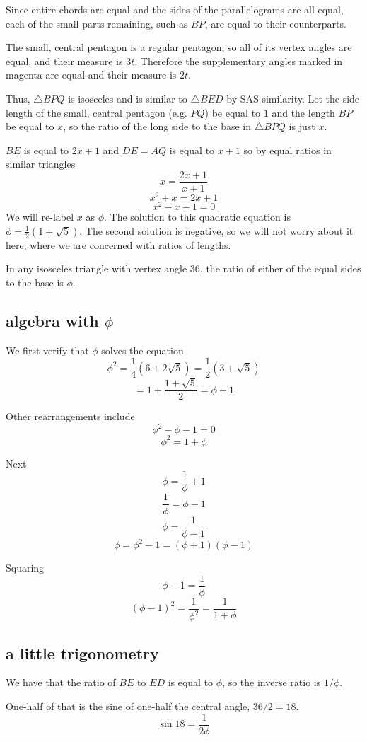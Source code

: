 \documentclass[11pt, oneside]{article}
\begin{document}
Since entire chords are equal and the sides of the parallelograms are all equal, each of the small parts remaining, such as $BP$, are equal to their counterparts.

The small, central pentagon is a regular pentagon, so all of its vertex angles are equal, and their measure is $3t$.  Therefore the supplementary angles marked in magenta are equal and their measure is $2t$.

Thus, $\triangle BPQ$ is isosceles and is similar to $\triangle BED$ by SAS similarity.
Let the side length of the small, central pentagon (e.g. $PQ$) be equal to $1$ and the length $BP$ be equal to $x$, so the ratio of the long side to the base in $\triangle BPQ$ is just $x$.  

$BE$ is equal to $2x + 1$ and $DE = AQ$ is equal to $x + 1$ so by equal ratios in similar triangles
\[ x = \frac{2x + 1}{x + 1} \]
\[ x^2 + x = 2x + 1 \]
\[ x^2 - x - 1 = 0 \]
We will re-label $x$ as $\phi$.  The solution to this quadratic equation is $\phi = \frac{1}{2}(1 + \sqrt{5})$.  The second solution is negative, so we will not worry about it here, where we are concerned with ratios of lengths.

In any isosceles triangle with vertex angle $36$, the ratio of either of the equal sides to the base is $\phi$.

\subsection*{algebra with $\phi$}

We first verify that $\phi$ solves the equation
\[ \phi^2 = \frac{1}{4}(6 + 2 \sqrt{5}) = \frac{1}{2}(3 + \sqrt{5}) \]
\[ = 1 + \frac{1 + \sqrt{5}}{2} = \phi + 1 \]

Other rearrangements include
\[ \phi^2 - \phi - 1 = 0 \]
\[ \phi^2 = 1 + \phi \]

Next
\[ \phi = \frac{1}{\phi} + 1 \]
\[ \frac{1}{\phi} = \phi - 1 \]
\[ \phi = \frac{1}{\phi - 1} \]
\[ \phi = \phi^2 - 1 = (\phi + 1)(\phi - 1) \]

Squaring
\[ \phi - 1 = \frac{1}{\phi} \]
\[ (\phi - 1)^2 = \frac{1}{\phi^2} = \frac{1}{1 + \phi} \]

\subsection*{a little trigonometry}
We have that the ratio of $BE$ to $ED$ is equal to $\phi$, so the inverse ratio is $1/\phi$.  

One-half of that is the sine of one-half the central angle, $36/2 = 18$.
\[ \sin 18 = \frac{1}{2 \phi} \]
\end{document}
